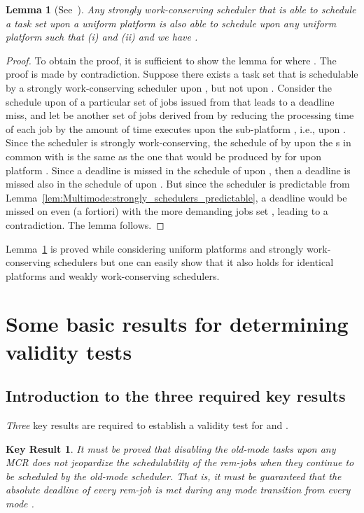 \documentclass{article}
\newtheorem{validity test}{Validity Test}
\newtheorem{Lemma}{Lemma}
\newtheorem{proof}{Proof}
\newtheorem{KeyResult}{Key Result}
\begin{document}
\begin{Lemma}[See~\cite{MeumeuNelisGoossens:10}]
\label{lem:Multimode:no_anomalies}
Any strongly work-conserving scheduler that is able to schedule a task set  upon a uniform platform  is also able to schedule  upon any uniform platform  such that (i)  and (ii)  and  we have .
\end{Lemma} 
\begin{proof}
To obtain the proof, it is sufficient to show the lemma for  where . The proof is made by contradiction. Suppose there exists a task set  that is schedulable by a strongly work-conserving scheduler  upon , but not upon . Consider the schedule upon  of a particular set  of jobs issued from  that leads to a deadline miss, and let  be another set of jobs derived from  by reducing the processing time of each job  by the amount of time  executes upon the sub-platform , i.e., upon . Since the scheduler is strongly work-conserving, the schedule of  by  upon the s in common with  is the same as the one that would be produced by  for  upon platform . Since a deadline is missed in the schedule of  upon , then a deadline is missed also in the schedule of  upon . But since the scheduler is predictable from Lemma~\ref{lem:Multimode:strongly_schedulers_predictable}, a deadline would be missed on  even (a fortiori) with the more demanding jobs set , leading to a contradiction. The lemma follows. 
\end{proof}

Lemma~\ref{lem:Multimode:no_anomalies} is proved while considering uniform platforms and strongly work-conserving schedulers but one can easily show that it also holds for identical platforms and weakly work-conserving schedulers. 



\section{Some basic results for determining validity tests}
\label{sec:Multimode:prelim_validity_tests}

\subsection{Introduction to the three required key results}
\label{sec:Multimode:three_key_results}

\emph{Three} key results are required to establish a validity test for  and . 

\begin{KeyResult}
It must be proved that disabling the old-mode tasks upon any MCR does not jeopardize the schedulability of the rem-jobs when they continue to be scheduled by the old-mode scheduler. That is, it must be guaranteed that the absolute deadline  of every rem-job  is met during any mode transition from every mode .
\end{KeyResult}
\end{document}
